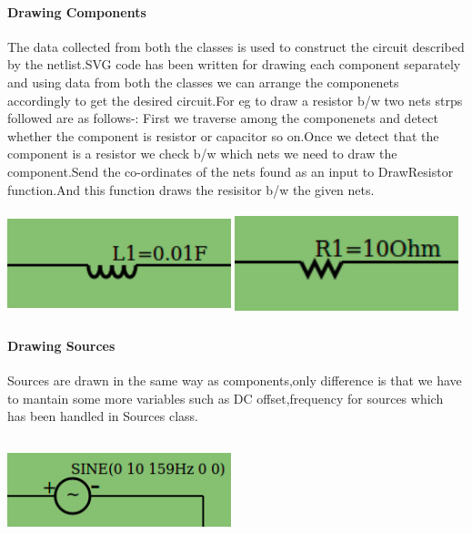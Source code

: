 \documentclass[12pt]{extarticle}
\begin{document}
\paragraph{Drawing Components}
The data collected from both the classes is used to construct the circuit described by the netlist.SVG code has been written for drawing each component separately and using data from both the classes we can arrange the componenets accordingly to get the desired circuit.For eg to draw a resistor b/w two nets strps followed are as follows-:
First we traverse among the componenets and detect whether the component is resistor or capacitor so on.Once we detect that the component is a resistor we check b/w which nets we need to draw the component.Send the co-ordinates of the nets found as an input to DrawResistor function.And this function draws the resisitor b/w the given nets.
\\
\begin{center}
\includegraphics[width=6.5cm, height=3cm]{Inductor}
\hspace{2mm}
\includegraphics[width=6.5cm, height=3cm]{Resistor}
\end{center}
\paragraph{Drawing Sources}
Sources are drawn in the same way as components,only difference is that we have to mantain some more variables such as DC offset,frequency for sources which has been handled in Sources class.  
\\
\begin{center}
\includegraphics[width=6.5cm, height=3cm]{Source}
\end{center}
\end{document}
